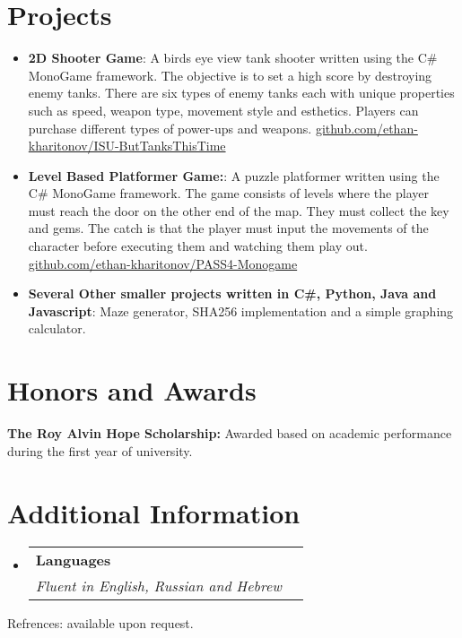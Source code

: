 \documentclass[a4paper,20pt]{article}
\makeatletter
\newcommand{\resumeItem}[2]{
	\item\small{
		\textbf{#1}{: #2 \vspace{-2pt}}
	}
}
\newcommand{\resumeSubheading}[4]{
	\vspace{-1pt}\item
	\begin{tabular*}{0.97\textwidth}{l@{\extracolsep{\fill}}r}
		\textbf{#1} & #2 \\
		\textit{#3} & \textit{#4} \\
	\end{tabular*}\vspace{-5pt}
}
\newcommand{\resumeSubItem}[2]{\resumeItem{#1}{#2}\vspace{-3pt}}
\newcommand{\resumeSubHeadingListStart}{\begin{itemize}[leftmargin=*]}
\newcommand{\resumeSubHeadingListEnd}{\end{itemize}}
\makeatother
\begin{document}
	\section{Projects}
	\resumeSubHeadingListStart
	\resumeSubItem{2D Shooter Game}{A birds eye view tank shooter written using the C\# MonoGame framework. The objective is to set a high score by destroying enemy tanks. There are six types of enemy tanks each with unique properties such as speed, weapon type, movement style and esthetics. Players can purchase different types of power-ups and weapons. \href{https://github.com/ethan-kharitonov/ISU-ButTanksThisTime}{github.com/ethan-kharitonov/ISU-ButTanksThisTime}}
	\vspace{2pt}
	\resumeSubItem{Level Based Platformer Game:}{A puzzle platformer written using the C\# MonoGame framework. The game consists of levels where the player must reach the door on the other end of the map. They must collect the key and gems. The catch is that the player must input the movements of the character before executing them and watching them play out. \href{https://github.com/ethan-kharitonov/PASS4-Monogame}{github.com/ethan-kharitonov/PASS4-Monogame}}
	\vspace{2pt}
	\resumeSubItem{Several Other smaller projects written in C\#, Python, Java and Javascript}{Maze generator, SHA256 implementation and a simple graphing calculator.}
	\vspace{2pt}
	\resumeSubHeadingListEnd
	\vspace{-5pt}

	\section{Honors and Awards}
	\begin{description}[font=$\bullet$]
		\item {\textbf{The Roy Alvin Hope Scholarship:} Awarded based on academic performance during the first year of university.}
	\end{description}
	
	\vspace{-5pt}
	\section{Additional Information}
	\resumeSubHeadingListStart
	\resumeSubheading
	{Languages}{}
	{Fluent in English, Russian and Hebrew}{}
	\vspace{5pt}
	\resumeSubHeadingListEnd
	\begin{center}
		Refrences: available upon request.
	\end{center}
	
\end{document}

